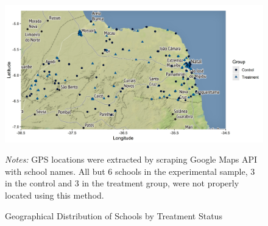 \documentclass[11pt,a4paper]{article}
\begin{document}
\begin{figure}[htbp]
    \caption{Geographical Distribution of Schools by Treatment Status}
    \label{fig:treat_map}
    \centering
    
    \includegraphics[width=15cm]{DataWork/Output/Figures/figA4-treat_map.png}
    
    \begin{minipage}{0.92\textwidth}
        \small{\textit{Notes:} GPS locations were extracted by scraping Google Maps API with school names. All but 6 schools in the experimental sample, 3 in the control and 3 in the treatment group, were not properly located using this method.}
    \end{minipage}
\end{figure}
\end{document}
